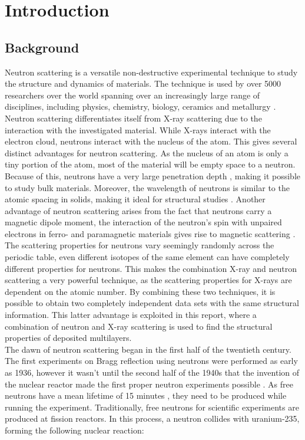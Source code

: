 \chapter{Introduction}\label{introduction}

\section{Background}
Neutron scattering is a versatile non-destructive experimental technique to study the structure and dynamics of materials. The technique is used by over 5000 researchers over the world \cite{lefmann2017neutron} spanning over an increasingly large range of disciplines, including physics, chemistry, biology, ceramics and metallurgy \cite{applications}. Neutron scattering differentiates itself from X-ray scattering due to the interaction with the investigated material. While X-rays interact with the electron cloud, neutrons interact with the nucleus of the atom. This gives several distinct advantages for neutron scattering. As the nucleus of an atom is only a tiny portion of the atom, most of the material will be empty space to a neutron. Because of this, neutrons have a very large penetration depth \cite{neutronapplicationspaper}, making it possible to study bulk materials. Moreover, the wavelength of neutrons is similar to the atomic spacing in solids, making it ideal for structural studies \cite{neutronscattering_book}. Another advantage of neutron scattering arises from the fact that neutrons carry a magnetic dipole moment, the interaction of the neutron's spin with unpaired electrons in ferro- and paramagnetic materials gives rise to magnetic scattering \cite{magneticscattering}. The scattering properties for neutrons vary seemingly randomly across the periodic table, even different isotopes of the same element can have completely different properties for neutrons. This makes the combination X-ray and neutron scattering a very powerful technique, as the scattering properties for X-rays are dependent on the atomic number. By combining these two techniques, it is possible to obtain two completely independent data sets with the same structural information. This latter advantage is exploited in this report, where a combination of neutron and X-ray scattering is used to find the structural properties of deposited multilayers. \\
The dawn of neutron scattering began in the first half of the twentieth century. The first experiments on Bragg reflection using neutrons were performed as early as 1936, however it wasn't until the second half of the 1940s that the invention of the nuclear reactor made the first proper neutron experiments possible \cite{belushkin1999neutron}. As free neutrons have a  mean lifetime of 15 minutes \cite{neutronscattering_book}, they need to be produced while running the experiment. Traditionally, free neutrons for scientific experiments are produced at fission reactors. In this process, a neutron collides with uranium-235, forming the following nuclear reaction:
